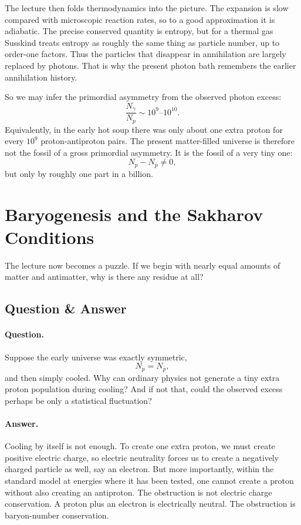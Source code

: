 The lecture then folds thermodynamics into the picture. The expansion is slow compared with microscopic reaction rates, so to a good approximation it is adiabatic. The precise conserved quantity is entropy, but for a thermal gas Susskind treats entropy as roughly the same thing as particle number, up to order-one factors. Thus the particles that disappear in annihilation are largely replaced by photons. That is why the present photon bath remembers the earlier annihilation history.

So we may infer the primordial asymmetry from the observed photon excess:
\begin{equation}
\frac{N_\gamma}{N_p} \sim 10^9\text{--}10^{10}.
\end{equation}
Equivalently, in the early hot soup there was only about one extra proton for every \(10^9\) proton-antiproton pairs. The present matter-filled universe is therefore not the fossil of a gross primordial asymmetry. It is the fossil of a very tiny one:
\begin{equation}
N_p-N_{\bar p} \neq 0,
\end{equation}
but only by roughly one part in a billion.

\section{Baryogenesis and the Sakharov Conditions}

The lecture now becomes a puzzle. If we begin with nearly equal amounts of matter and antimatter, why is there any residue at all?

\subsection{Question \& Answer}

\paragraph{Question.} Suppose the early universe was exactly symmetric,
\begin{equation}
N_p=N_{\bar p},
\end{equation}
and then simply cooled. Why can ordinary physics not generate a tiny extra proton population during cooling? And if not that, could the observed excess perhaps be only a statistical fluctuation?

\paragraph{Answer.} Cooling by itself is not enough. To create one extra proton, we must create positive electric charge, so electric neutrality forces us to create a negatively charged particle as well, say an electron. But more importantly, within the standard model at energies where it has been tested, one cannot create a proton without also creating an antiproton. The obstruction is not electric charge conservation. A proton plus an electron is electrically neutral. The obstruction is baryon-number conservation.

